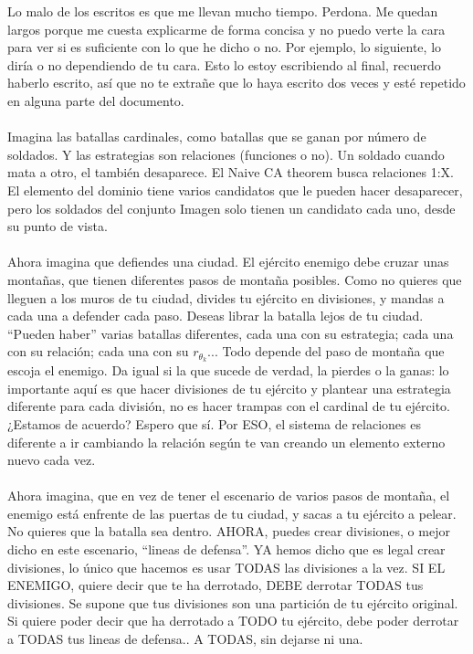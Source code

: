 	\noindent
	Lo malo de los escritos es que me llevan mucho tiempo. Perdona. Me quedan largos porque me cuesta explicarme de forma concisa y no puedo verte la cara para ver si es suficiente con lo que he dicho o no. Por ejemplo, lo siguiente, lo diría o no dependiendo de tu cara. Esto lo estoy escribiendo al final, recuerdo haberlo escrito, así que no te extrañe que lo haya escrito dos veces y esté repetido en alguna parte del documento.
	\\\\
	
	\noindent
	Imagina las batallas cardinales, como batallas que se ganan por número de soldados. Y las estrategias son relaciones (funciones o no). Un soldado cuando mata a otro, el también desaparece. El Naive CA theorem busca relaciones 1:X. El elemento del dominio tiene varios candidatos que le pueden hacer desaparecer, pero los soldados del conjunto Imagen solo tienen un candidato cada uno, desde su punto de vista.
	\\\\
	
	\noindent
	Ahora imagina que defiendes una ciudad. El ejército enemigo debe cruzar unas montañas, que tienen diferentes pasos de montaña posibles. Como no quieres que lleguen a los muros de tu ciudad, divides tu ejército en divisiones, y mandas a cada una a defender cada paso. Deseas librar la batalla lejos de tu ciudad. ``Pueden haber'' varias batallas diferentes, cada una con su estrategia; cada una con su relación; cada una con su $r_{\theta_{k}}$... Todo depende del paso de montaña que escoja el enemigo. Da igual si la que sucede de verdad, la pierdes o la ganas: lo importante aquí es que hacer divisiones de tu ejército y plantear una estrategia diferente para cada división, no es hacer trampas con el cardinal de tu ejército. ¿Estamos de acuerdo? Espero que sí. Por ESO, el sistema de relaciones es diferente a ir cambiando la relación según te van creando un elemento externo nuevo cada vez.
	\\\\
	
	\noindent
	Ahora imagina, que en vez de tener el escenario de varios pasos de montaña, el enemigo está enfrente de las puertas de tu ciudad, y sacas a tu ejército a pelear. No quieres que la batalla sea dentro. AHORA, puedes crear divisiones, o mejor dicho en este escenario, ``lineas de defensa''. YA hemos dicho que es legal crear divisiones, lo único que hacemos es usar TODAS las divisiones a la vez. SI EL ENEMIGO, quiere decir que te ha derrotado, DEBE derrotar TODAS tus divisiones. Se supone que tus divisiones son una partición de tu ejército original. Si quiere poder decir que ha  derrotado a TODO tu ejército, debe poder derrotar a TODAS tus lineas de defensa.. A TODAS, sin dejarse ni una.
	\\\\
	
